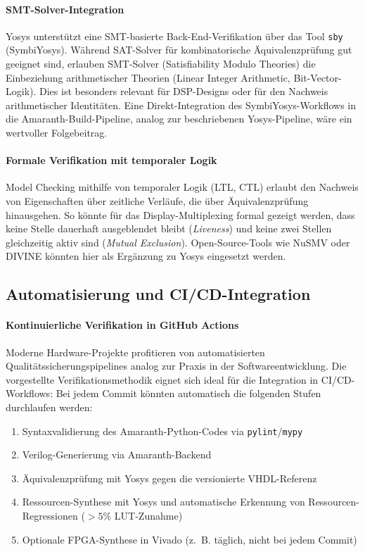 ﻿\documentclass[12pt,a4paper]{report}
\begin{document}
\paragraph{SMT-Solver-Integration}
Yosys unterstützt eine SMT-basierte Back-End-Verifikation über das Tool \texttt{sby}
(SymbiYosys). Während SAT-Solver für kombinatorische Äquivalenz\-prüfung gut geeignet sind,
erlauben SMT-Solver (Satisfiability Modulo Theories) die Einbeziehung arithmetischer
Theorien (Linear Integer Arithmetic, Bit-Vector-Logik). Dies ist besonders relevant für
DSP-Designs oder für den Nachweis arithmetischer Identitäten. Eine Direkt-Integration
des SymbiYosys-Workflows in die Amaranth-Build-Pipeline, analog zur beschriebenen
Yosys-Pipeline, wäre ein wertvoller Folgebeitrag.

\paragraph{Formale Verifikation mit temporaler Logik}
Model Checking mithilfe von temporaler Logik (LTL, CTL) erlaubt den Nachweis von
Eigenschaften über zeitliche Verläufe, die über Äquivalenzprüfung hinausgehen. So könnte
für das Display-Multiplexing formal gezeigt werden, dass keine Stelle dauerhaft
ausgeblendet bleibt (\textit{Liveness}) und keine zwei Stellen gleichzeitig aktiv sind
(\textit{Mutual Exclusion}). Open-Source-Tools wie NuSMV oder DIVINE könnten hier als
Ergänzung zu Yosys eingesetzt werden.

\subsection{Automatisierung und CI/CD-Integration}

\paragraph{Kontinuierliche Verifikation in GitHub Actions}
Moderne Hardware-Projekte profitieren von automatisierten Qualitätssicherungspipelines
analog zur Praxis in der Softwareentwicklung. Die vorgestellte Verifikationsmethodik
eignet sich ideal für die Integration in CI/CD-Workflows: Bei jedem Commit könnten
automatisch die folgenden Stufen durchlaufen werden:

\begin{enumerate}
  \item Syntaxvalidierung des Amaranth-Python-Codes via \texttt{pylint}/\texttt{mypy}
  \item Verilog-Generierung via Amaranth-Backend
  \item Äquivalenzprüfung mit Yosys gegen die versionierte VHDL-Referenz
  \item Ressourcen-Synthese mit Yosys und automatische Erkennung von
        Ressourcen-Regres\-sionen ($>5\%$ LUT-Zunahme)
  \item Optionale FPGA-Synthese in Vivado (z.~B. täglich, nicht bei jedem Commit)
\end{enumerate}
\end{document}
